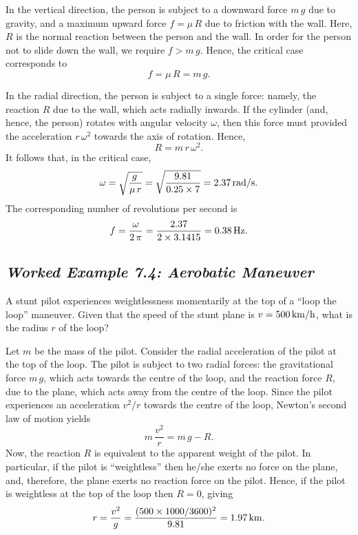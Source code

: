 \begin{figure*}[h]
\epsfysize=2in
\centerline{}
\end{figure*}

 In the vertical direction, the person is subject to
a downward force $m\,g$ due to gravity, and a maximum upward force $f=\mu\,R$ due
to friction with the wall. Here, $R$ is the normal reaction between the person
and the wall. In order for the person not to slide down the wall, we require
$f>m\,g$. Hence, the critical case corresponds to 
$$
f=\mu\,R=m\,g.
$$

In the radial direction, the person is subject to a single force: namely, the reaction
$R$ due to the wall, which acts radially inwards. If the cylinder (and, hence, the person)
rotates with angular velocity $\omega$, then this force must provided the acceleration
$r\,\omega^2$ towards the axis of rotation. Hence,
$$
R = m\,r\,\omega^2.
$$
It follows that, in the critical case,
$$
\omega = \sqrt{\frac{g\,}{\mu\,r}} = \sqrt{\frac{9.81}{0.25\times 7}} = 2.37\,{\rm rad/s}.
$$
The corresponding number of revolutions per second is
$$
f = \frac{\omega}{2\,\pi} = \frac{2.37}{2\times 3.1415} = 0.38\,{\rm Hz}.
$$

\subsection*{\em Worked Example 7.4: Aerobatic Maneuver} 

\begin{figure*}[h]
\epsfysize=2in
\centerline{}
\end{figure*}

 A stunt pilot experiences weightlessness
momentarily at the top of a ``loop the loop'' maneuver. Given that the
speed of the stunt plane is $v=500\,{\rm km/h}$, what is the radius $r$ of the
loop?

 Let $m$ be the mass of the pilot.
Consider the radial acceleration of the pilot at the
top of the loop. The pilot is subject to two radial forces: the gravitational
force $m\,g$, which acts towards the centre of the loop, and the reaction force $R$,
due to the plane, which acts away from the centre of the loop. Since the pilot
experiences an acceleration $v^2/r$ towards the centre of the loop, Newton's second
law of motion yields
$$
m\,\frac{v^2}{r} = m\,g- R.
$$
Now, the reaction $R$ is equivalent to the apparent weight of the pilot. 
In particular, if the pilot is ``weightless'' then he/she exerts no force on the plane, and,
therefore, the plane exerts no reaction force on the pilot. Hence, if the pilot is 
weightless at the top of the loop then $R=0$, giving
$$
r = \frac{v^2}{g} = \frac{(500\times 1000/3600)^2}{9.81} = 1.97\,{\rm km}.
$$


